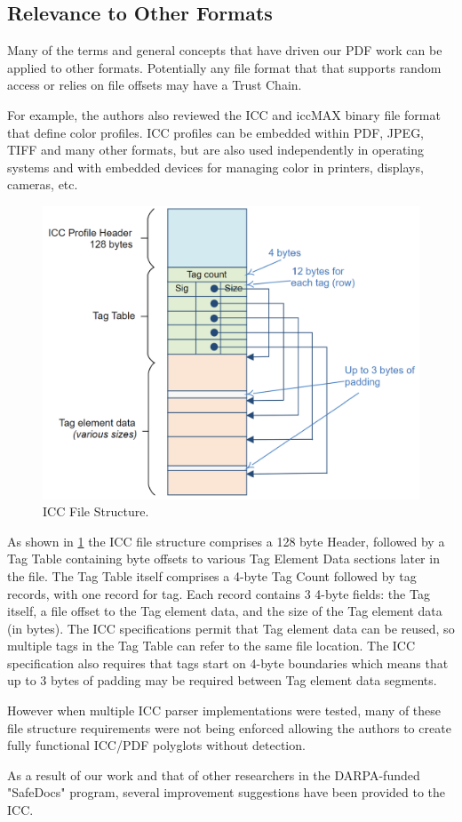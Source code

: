 \subsection{Relevance to Other Formats}
\label{sec:other-formats}

Many of the terms and general concepts that have driven our PDF work
can be applied to other formats. Potentially any file format that that supports random access or relies on file offsets may have a Trust Chain.

For example, the authors also reviewed the ICC \cite{isotc130jwg7ISO15076120102010} and 
iccMAX \cite{iccSpecificationICC20192019} binary file format that define color profiles.
ICC profiles can be embedded within PDF, JPEG, TIFF and many other formats, but are also 
used independently in operating systems and with embedded devices for managing color in 
printers, displays, cameras, etc.

\begin{figure}[t]
    \centering
    \includegraphics[width=0.85\linewidth]{figures/icc.png}
    \caption{ICC File Structure.}
    \label{fig:icc-structure}
\end{figure}

As shown in \cref{fig:icc-structure} the ICC file structure comprises a 128 byte Header, followed by a 
Tag Table containing byte offsets to various Tag Element Data sections later in the file. 
The Tag Table itself comprises a 4-byte Tag Count followed by tag records, with one record for tag. 
Each record contains 3 4-byte fields: the Tag itself, a file offset to the Tag element data, and the size of the Tag element data (in bytes).
The ICC specifications permit that Tag element data can be reused, so multiple tags in the Tag Table can
refer to the same file location. The ICC specification also requires that tags start on 4-byte boundaries
which means that up to 3 bytes of padding may be required between Tag element data segments.

However when multiple ICC parser implementations were tested, many of these file structure requirements
were not being enforced allowing the authors to create fully functional ICC/PDF polyglots 
without detection.

As a result of our work and that of other researchers in the DARPA-funded "SafeDocs" program, several
improvement suggestions have been provided to the ICC.
